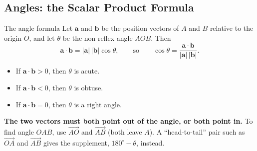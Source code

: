 \subsection{Angles: the Scalar Product Formula}
\begin{definition}{The angle formula}
Let $\mathbf{a}$ and $\mathbf{b}$ be the position vectors of $A$ and $B$ relative to the origin $O$, and let $\theta$ be the non-reflex angle $AOB$. Then
\[
\mathbf{a}\cdot\mathbf{b} = |\mathbf{a}|\,|\mathbf{b}|\cos\theta,
\qquad\text{so}\qquad
\cos\theta = \dfrac{\mathbf{a}\cdot\mathbf{b}}{|\mathbf{a}|\,|\mathbf{b}|}.
\]
\end{definition}
\noindent\begin{minipage}[c]{0.46\textwidth}
\begin{itemize}
  \item If $\mathbf{a}\cdot\mathbf{b} > 0$, then $\theta$ is acute.
  \item If $\mathbf{a}\cdot\mathbf{b} < 0$, then $\theta$ is obtuse.
  \item If $\mathbf{a}\cdot\mathbf{b} = 0$, then $\theta$ is a right angle.
\end{itemize}
\end{minipage}\hfill
\begin{minipage}[c]{0.5\textwidth}\centering
{}
\end{minipage}

\begin{caution}
\textbf{The two vectors must both point out of the angle, or both point in.} To find angle $OAB$, use $\overrightarrow{AO}$ and $\overrightarrow{AB}$ (both leave $A$). A ``head-to-tail'' pair such as $\overrightarrow{OA}$ and $\overrightarrow{AB}$ gives the supplement, $180^{\circ} - \theta$, instead.
\end{caution}




